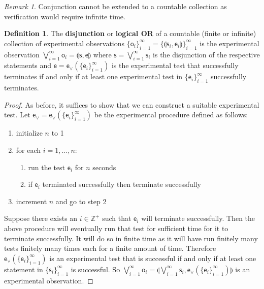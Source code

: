 \documentclass[preprint]{elsarticle}
\theoremstyle{plain}%
\theoremstyle{definition}
\newtheorem{defn}{Definition}[section]
\theoremstyle{remark}
\newtheorem*{rem}{Remark}
\begin{document}
\begin{rem}
	Conjunction cannot be extended to a countable collection as verification would require infinite time.
\end{rem}

\begin{defn}
	The \textbf{disjunction} or \textbf{logical OR} of a countable (finite or infinite) collection of experimental observations $\{\mathsf{o}_i\}_{i=1}^{\infty}=\{\llparenthesis \mathsf{s}_i, \mathsf{e}_i\rrparenthesis\}_{i=1}^{\infty}$ is the experimental observation $\bigvee\limits_{i=1}^{\infty} \mathsf{o}_i = \llparenthesis \mathsf{s}, \mathsf{e}\rrparenthesis$ where $\mathsf{s} = \bigvee\limits_{i=1}^{\infty} \mathsf{s}_i$ is the disjunction of the respective statements and $\mathsf{e} = \mathsf{e}_\vee(\{\mathsf{e}_i\}_{i=1}^{\infty})$ is the experimental test that successfully terminates if and only if at least one experimental test in $\{\mathsf{e}_i\}_{i=1}^{\infty}$ successfully terminates.
\end{defn}

\begin{proof}
	As before, it suffices to show that we can construct a suitable experimental test. Let $\mathsf{e}_\vee=\mathsf{e}_\vee(\{\mathsf{e}_i\}_{i=1}^{\infty})$ be the experimental procedure defined as follows:
	\begin{enumerate}
	\item initialize $n$ to 1
	\item for each $i=1,\ldots,n$:
	\begin{enumerate}
		\item run the test $\mathsf{e}_i$ for $n$ seconds
		\item if $\mathsf{e}_i$ terminated successfully then terminate successfully
	\end{enumerate}
	\item increment $n$ and go to step 2
	\end{enumerate}
	Suppose there exists an $i \in \mathbb{Z}^+$ such that $\mathsf{e}_i$ will terminate successfully. Then the above procedure will eventually run that test for sufficient time for it to terminate successfully. It will do so in finite time as it will have run finitely many tests finitely many times each for a finite amount of time. Therefore $\mathsf{e}_\vee(\{\mathsf{e}_i\}_{i=1}^{\infty})$ is an experimental test that is successful if and only if at least one statement in $\{\mathsf{s}_i\}_{i=1}^{\infty}$ is successful. So $\bigvee\limits_{i=1}^{\infty} \mathsf{o}_i =\llparenthesis\bigvee\limits_{i=1}^{\infty} \mathsf{s}_i, \mathsf{e}_{\vee}(\{\mathsf{e}_i\}_{i=1}^{\infty})\rrparenthesis$ is an experimental observation.
\end{proof}
\end{document}
